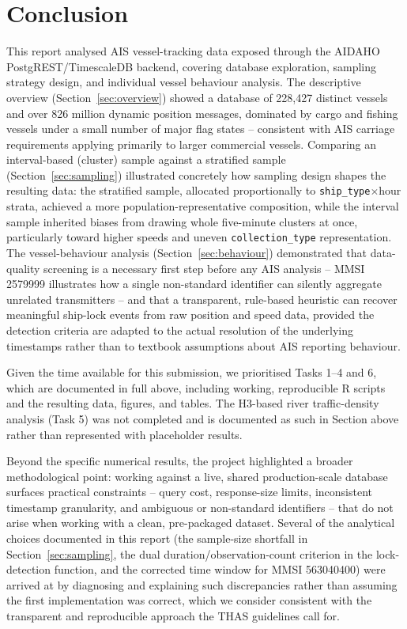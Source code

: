 \documentclass[11pt,a4paper]{article}
\begin{document}
\section{Conclusion}

This report analysed AIS vessel-tracking data exposed through the AIDAHO
PostgREST/TimescaleDB backend, covering database exploration, sampling
strategy design, and individual vessel behaviour analysis. The descriptive
overview (Section~\ref{sec:overview}) showed a database of 228{,}427 distinct
vessels and over 826 million dynamic position messages, dominated by cargo
and fishing vessels under a small number of major flag states -- consistent
with AIS carriage requirements applying primarily to larger commercial
vessels. Comparing an interval-based (cluster) sample against a stratified
sample (Section~\ref{sec:sampling}) illustrated concretely how sampling design
shapes the resulting data: the stratified sample, allocated proportionally to
\texttt{ship\_type}$\times$hour strata, achieved a more population-representative
composition, while the interval sample inherited biases from drawing whole
five-minute clusters at once, particularly toward higher speeds and uneven
\texttt{collection\_type} representation. The vessel-behaviour analysis
(Section~\ref{sec:behaviour}) demonstrated that data-quality screening is a
necessary first step before any AIS analysis -- MMSI 2579999 illustrates how
a single non-standard identifier can silently aggregate unrelated
transmitters -- and that a transparent, rule-based heuristic can recover
meaningful ship-lock events from raw position and speed data, provided the
detection criteria are adapted to the actual resolution of the underlying
timestamps rather than to textbook assumptions about AIS reporting behaviour.

Given the time available for this submission, we prioritised Tasks 1--4 and
6, which are documented in full above, including working, reproducible R
scripts and the resulting data, figures, and tables. The H3-based river
traffic-density analysis (Task 5) was not completed and is documented as
such in Section above rather than represented with placeholder
results.

Beyond the specific numerical results, the project highlighted a broader
methodological point: working against a live, shared production-scale
database surfaces practical constraints -- query cost, response-size limits,
inconsistent timestamp granularity, and ambiguous or non-standard identifiers
-- that do not arise when working with a clean, pre-packaged dataset. Several
of the analytical choices documented in this report (the sample-size
shortfall in Section~\ref{sec:sampling}, the dual duration/observation-count
criterion in the lock-detection function, and the corrected time window for
MMSI 563040400) were arrived at by diagnosing and explaining such
discrepancies rather than assuming the first implementation was correct, which
we consider consistent with the transparent and reproducible approach the
THAS guidelines call for.
\end{document}
